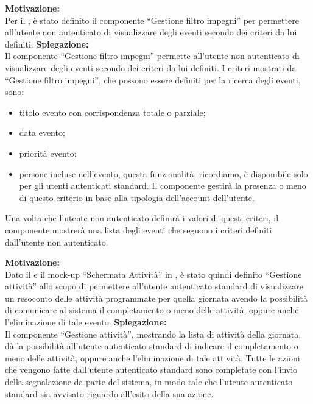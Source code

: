 \begin{listaPersonale}[ACI]{}

    \textbf{Motivazione:}\\
    Per il , è stato definito il componente “Gestione filtro impegni” per permettere all'utente non autenticato di visualizzare degli eventi secondo dei criteri da lui definiti.
    \textbf{Spiegazione:}\\
    Il componente “Gestione filtro impegni” permette all'utente non autenticato di visualizzare degli eventi secondo dei criteri da lui definiti. I criteri mostrati da “Gestione filtro impegni”, che possono essere definiti per la ricerca degli eventi, sono:
    \begin{itemize}
        \item titolo evento con corrispondenza totale o parziale;
        \item data evento;
        \item priorità evento;
        \item persone incluse nell'evento, questa funzionalità, ricordiamo, è disponibile solo per gli utenti autenticati standard. Il componente gestirà la presenza o meno di questo criterio in base alla tipologia dell'account dell'utente.
    \end{itemize}
    Una volta che l'utente non autenticato definirà i valori di questi criteri, il componente mostrerà una lista degli eventi che seguono i criteri definiti dall'utente non autenticato.



    \textbf{Motivazione:}\\
    Dato il  e il mock-up “Schermata Attività” in , è stato quindi definito “Gestione attività” allo scopo di permettere all'utente autenticato standard di visualizzare un resoconto delle attività programmate per quella giornata avendo la possibilità di comunicare al sistema il completamento o meno delle attività, oppure anche l'eliminazione di tale evento.
    \textbf{Spiegazione:}\\
    Il componente “Gestione attività”, mostrando la lista di attività della giornata, dà la possibilità all'utente autenticato standard di indicare il completamento o meno delle attività, oppure anche l'eliminazione di tale attività. Tutte le azioni che vengono fatte dall'utente autenticato standard sono completate con l'invio della segnalazione da parte del sistema, in modo tale che l'utente autenticato standard sia avvisato riguardo all'esito della sua azione.



\end{listaPersonale}
